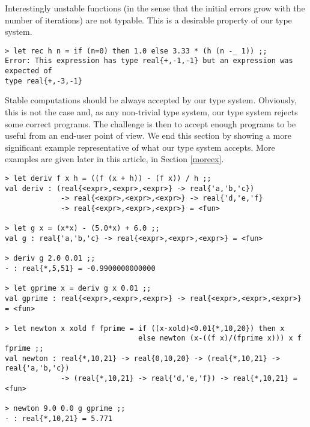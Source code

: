 Interestingly unstable functions (in the sense that the initial errors grow with 
the number of iterations) are not typable. This is a desirable property of our type system.
\begin{verbatim}
> let rec h n = if (n=0) then 1.0 else 3.33 * (h (n -_ 1)) ;;
Error: This expression has type real{+,-1,-1} but an expression was expected of 
type real{+,-3,-1}
\end{verbatim}

Stable computations should be always accepted by our type system. Obviously,
this is not the case and, as any non-trivial type system, our type system rejects some correct programs.
The challenge is then to accept enough programs to be useful from an end-user point of view.
We end this section by showing a more significant example representative of what our type
system accepts. More examples are given later in this article, in Section \ref{moreex}.

\begin{verbatim}
> let deriv f x h = ((f (x + h)) - (f x)) / h ;;
val deriv : (real{<expr>,<expr>,<expr>} -> real{'a,'b,'c}) 
             -> real{<expr>,<expr>,<expr>} -> real{'d,'e,'f} 
             -> real{<expr>,<expr>,<expr>} = <fun>

> let g x = (x*x) - (5.0*x) + 6.0 ;;
val g : real{'a,'b,'c} -> real{<expr>,<expr>,<expr>} = <fun>

> deriv g 2.0 0.01 ;;
- : real{*,5,51} = -0.9900000000000

> let gprime x = deriv g x 0.01 ;;
val gprime : real{<expr>,<expr>,<expr>} -> real{<expr>,<expr>,<expr>} = <fun>

> let newton x xold f fprime = if ((x-xold)<0.01{*,10,20}) then x 
                               else newton (x-((f x)/(fprime x))) x f fprime ;;
val newton : real{*,10,21} -> real{0,10,20} -> (real{*,10,21} -> real{'a,'b,'c})
             -> (real{*,10,21} -> real{'d,'e,'f}) -> real{*,10,21} = <fun>

> newton 9.0 0.0 g gprime ;;
- : real{*,10,21} = 5.771
\end{verbatim}

